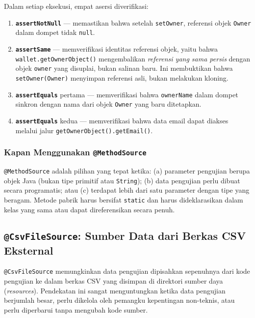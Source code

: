 \documentclass[12pt,a4paper]{article}
\begin{document}
Dalam setiap eksekusi, empat asersi diverifikasi:
\begin{enumerate}
  \item \textbf{\texttt{assertNotNull}} --- memastikan bahwa setelah \texttt{setOwner},
        referensi objek \texttt{Owner} dalam dompet tidak \texttt{null}.
  \item \textbf{\texttt{assertSame}} --- memverifikasi identitas referensi objek, yaitu
        bahwa \texttt{wallet.getOwnerObject()} mengembalikan \emph{referensi yang sama
        persis} dengan objek \texttt{owner} yang disuplai, bukan salinan baru.  Ini
        membuktikan bahwa \texttt{setOwner(Owner)} menyimpan referensi asli, bukan
        melakukan kloning.
  \item \textbf{\texttt{assertEquals}} pertama --- memverifikasi bahwa
        \texttt{ownerName} dalam dompet sinkron dengan nama dari objek \texttt{Owner}
        yang baru ditetapkan.
  \item \textbf{\texttt{assertEquals}} kedua --- memverifikasi bahwa data email dapat
        diakses melalui jalur \texttt{getOwnerObject().getEmail()}.
\end{enumerate}

\subsubsection{Kapan Menggunakan \texttt{@MethodSource}}

\texttt{@MethodSource} adalah pilihan yang tepat ketika: (a) parameter pengujian berupa
objek Java (bukan tipe primitif atau \texttt{String}); (b) data pengujian perlu dibuat
secara programatis; atau (c) terdapat lebih dari satu parameter dengan tipe yang beragam.
Metode pabrik harus bersifat \texttt{static} dan harus dideklarasikan dalam kelas yang
sama atau dapat direferensikan secara penuh.

\subsection{\texttt{@CsvFileSource}: Sumber Data dari Berkas CSV Eksternal}

\texttt{@CsvFileSource} memungkinkan data pengujian dipisahkan sepenuhnya dari kode
pengujian ke dalam berkas CSV yang disimpan di direktori sumber daya (\textit{resources}).
Pendekatan ini sangat menguntungkan ketika data pengujian berjumlah besar, perlu dikelola
oleh pemangku kepentingan non-teknis, atau perlu diperbarui tanpa mengubah kode sumber.
\end{document}
